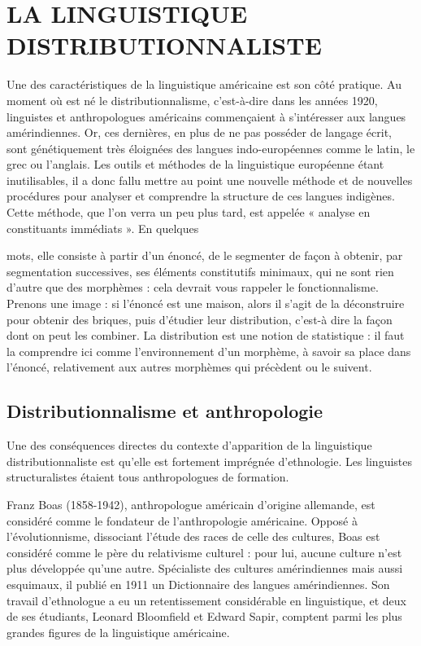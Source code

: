 \section{LA LINGUISTIQUE DISTRIBUTIONNALISTE}
Une des caractéristiques de la linguistique américaine est son côté pratique. Au moment où est né le distributionnalisme, c’est-à-dire dans les années 1920, linguistes et anthropologues américains commençaient à s’intéresser aux langues amérindiennes. Or, ces dernières, en plus de ne pas posséder de langage écrit, sont génétiquement très éloignées des langues indo-européennes comme le latin, le grec ou l’anglais. Les outils et méthodes de la linguistique européenne étant inutilisables, il a donc fallu mettre au point une nouvelle méthode et de nouvelles procédures pour analyser et comprendre la structure de ces langues indigènes. Cette méthode, que l’on verra un peu plus tard, est appelée « analyse en constituants immédiats ». En quelques


mots, elle consiste à partir d’un énoncé, de le segmenter de façon à obtenir, par segmentation successives, ses éléments constitutifs minimaux, qui ne sont rien d’autre que des morphèmes : cela devrait vous rappeler le fonctionnalisme. Prenons une image : si l’énoncé est une maison, alors il s’agit de la déconstruire pour obtenir des briques, puis d’étudier leur distribution, c’est-à dire la façon dont on peut les combiner. La distribution est une notion de statistique : il faut la comprendre ici comme l’environnement d’un morphème, à savoir sa place dans l’énoncé, relativement aux autres morphèmes qui précèdent ou le suivent.\par

\subsection{Distributionnalisme et anthropologie}
Une des conséquences directes du contexte d’apparition de la linguistique distributionnaliste est qu’elle est fortement imprégnée d’ethnologie. Les linguistes structuralistes étaient tous anthropologues de formation.\par


Franz Boas (1858-1942), anthropologue américain d’origine allemande, est considéré comme le fondateur de l’anthropologie américaine. Opposé à l’évolutionnisme, dissociant l’étude des races de celle des cultures, Boas est considéré comme le père du relativisme culturel : pour lui, aucune culture n’est plus développée qu’une autre. Spécialiste des cultures amérindiennes mais aussi esquimaux, il publié en 1911 un Dictionnaire des langues amérindiennes. Son travail d’ethnologue a eu un retentissement considérable en linguistique, et deux de ses étudiants, Leonard Bloomfield et Edward Sapir, comptent parmi les plus grandes figures de la linguistique américaine.\par

